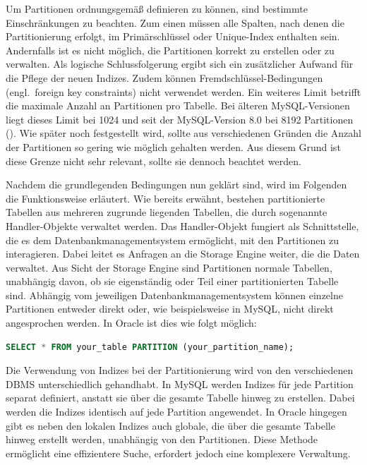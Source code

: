 Um Partitionen ordnungsgemäß definieren zu können, sind bestimmte Einschränkungen zu beachten.
Zum einen müssen alle Spalten, nach denen die Partitionierung erfolgt, im Primärschlüssel oder Unique-Index enthalten sein.
Andernfalls ist es nicht möglich, die Partitionen korrekt zu erstellen oder zu verwalten.
Als logische Schlussfolgerung ergibt sich ein zusätzlicher Aufwand für die Pflege der neuen Indizes.
Zudem können Fremdschlüssel-Bedingungen (engl.\ foreign key constraints) nicht verwendet werden.
Ein weiteres Limit betrifft die maximale Anzahl an Partitionen pro Tabelle.
Bei älteren MySQL-Versionen liegt dieses Limit bei 1024 und seit der MySQL-Version 8.0 bei 8192 Partitionen (\cite{mysql_nof_partitions}).
Wie später noch festgestellt wird, sollte aus verschiedenen Gründen die Anzahl der Partitionen so gering wie möglich gehalten werden.
Aus diesem Grund ist diese Grenze nicht sehr relevant, sollte sie dennoch beachtet werden.

Nachdem die grundlegenden Bedingungen nun geklärt sind, wird im Folgenden die Funktionsweise erläutert.
Wie bereits erwähnt, bestehen partitionierte Tabellen aus mehreren zugrunde liegenden Tabellen, die durch sogenannte Handler-Objekte verwaltet werden.
Das Handler-Objekt fungiert als Schnittstelle, die es dem Datenbankmanagementsystem ermöglicht, mit den Partitionen zu interagieren.
Dabei leitet es Anfragen an die Storage Engine weiter, die die Daten verwaltet.
Aus Sicht der Storage Engine sind Partitionen normale Tabellen, unabhängig davon, ob sie eigenständig oder Teil einer partitionierten Tabelle sind.
Abhängig vom jeweiligen Datenbankmanagementsystem können einzelne Partitionen entweder direkt oder, wie beispielsweise in MySQL, nicht direkt angesprochen werden.
In Oracle ist dies wie folgt möglich:

\vspace{-5pt}
\begin{lstlisting}[language=SQL,label={lst:direct_partition}]
SELECT * FROM your_table PARTITION (your_partition_name);
\end{lstlisting}
\vspace{-7pt}

Die Verwendung von Indizes bei der Partitionierung wird von den verschiedenen DBMS unterschiedlich gehandhabt.
In MySQL werden Indizes für jede Partition separat definiert, anstatt sie über die gesamte Tabelle hinweg zu erstellen.
Dabei werden die Indizes identisch auf jede Partition angewendet.
In Oracle hingegen gibt es neben den lokalen Indizes auch globale, die über die gesamte Tabelle hinweg erstellt werden, unabhängig von den Partitionen.
Diese Methode ermöglicht eine effizientere Suche, erfordert jedoch eine komplexere Verwaltung.

